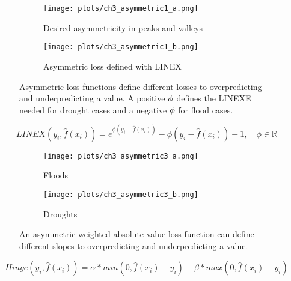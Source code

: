 \begin{figure}[ht]
	\centering
	\begin{subfigure}{.49\textwidth}
  		\centering
 		 \texttt{[image: plots/ch3\_asymmetric1\_a.png]}
  		\caption{Desired asymmetricity in peaks and valleys}
  		\label{fig:asymmetric1a}
	\end{subfigure}%
	\begin{subfigure}{.49\textwidth}
  		\centering
  		\texttt{[image: plots/ch3\_asymmetric1\_b.png]}
  		\caption{Asymmetric loss defined with LINEX}
  		\label{fig:asymmetric1b}
	\end{subfigure}
	\caption[Asymmetric loss functions.]{Asymmetric loss functions define different losses to overpredicting and underpredicting a value. A positive $\protect\phi$ defines the LINEXE needed for drought cases and a negative $\protect\phi$ for flood cases.}
	\label{fig:asymmetric1}
\end{figure}

\begin{equation} \label{eq:linex}
	LINEX(y_i,\hat{f}(x_i)) = e^{\phi(y_i-\hat{f}(x_i))} - \phi(y_i-\hat{f}(x_i))-1, \quad\text{$\phi$} \in \mathbb{R}
\end{equation}

\begin{figure}[ht]
	\centering
	\begin{subfigure}{.49\textwidth}
  		\centering
 		\texttt{[image: plots/ch3\_asymmetric3\_a.png]}
  		\caption{Floods}
  		\label{fig:asymmetric3a}
	\end{subfigure}%
	\begin{subfigure}{.49\textwidth}
  		\centering
  		\texttt{[image: plots/ch3\_asymmetric3\_b.png]}
  		\caption{Droughts}
  		\label{fig:asymmetric3b}
	\end{subfigure}
	\caption[Asymmetric weighted absolute value loss function.]{An asymmetric weighted absolute value loss function can define different slopes to overpredicting and underpredicting a value.}
	\label{fig:asymmetric3}
\end{figure}

\begin{equation} \label{eq:asshinge}
	Hinge(y_i,\hat{f}(x_i)) = \alpha*min(0, \hat{f}(x_i)-y_i)+ \beta*max(0, \hat{f}(x_i)-y_i)
\end{equation}

